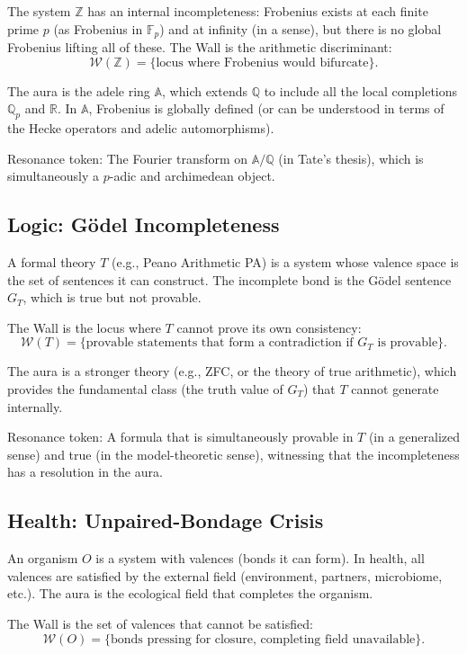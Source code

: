 \documentclass[12pt]{article}
\theoremstyle{definition}
\theoremstyle{remark}
\begin{document}
The system $\mathbb{Z}$ has an internal incompleteness: Frobenius exists at each finite prime $p$ (as Frobenius in $\mathbb{F}_p$) and at infinity (in a sense), but there is no global Frobenius lifting all of these. The Wall is the arithmetic discriminant:
\[
\mathcal{W}(\mathbb{Z}) = \{\text{locus where Frobenius would bifurcate}\}.
\]

The aura is the adele ring $\mathbb{A}$, which extends $\mathbb{Q}$ to include all the local completions $\mathbb{Q}_p$ and $\mathbb{R}$. In $\mathbb{A}$, Frobenius is globally defined (or can be understood in terms of the Hecke operators and adelic automorphisms).

Resonance token: The Fourier transform on $\mathbb{A} / \mathbb{Q}$ (in Tate's thesis), which is simultaneously a $p$-adic and archimedean object.

\subsection{Logic: G\"odel Incompleteness}

A formal theory $T$ (e.g., Peano Arithmetic PA) is a system whose valence space is the set of sentences it can construct. The incomplete bond is the G\"odel sentence $G_T$, which is true but not provable.

The Wall is the locus where $T$ cannot prove its own consistency:
\[
\mathcal{W}(T) = \{\text{provable statements that form a contradiction if } G_T \text{ is provable}\}.
\]

The aura is a stronger theory (e.g., ZFC, or the theory of true arithmetic), which provides the fundamental class (the truth value of $G_T$) that $T$ cannot generate internally.

Resonance token: A formula that is simultaneously provable in $T$ (in a generalized sense) and true (in the model-theoretic sense), witnessing that the incompleteness has a resolution in the aura.

\subsection{Health: Unpaired-Bondage Crisis}

An organism $O$ is a system with valences (bonds it can form). In health, all valences are satisfied by the external field (environment, partners, microbiome, etc.). The aura is the ecological field that completes the organism.

The Wall is the set of valences that cannot be satisfied:
\[
\mathcal{W}(O) = \{\text{bonds pressing for closure, completing field unavailable}\}.
\]
\end{document}
